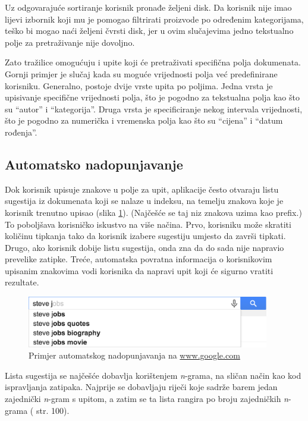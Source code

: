 \documentclass[a4paper,twoside,12pt]{scrreprt}
\begin{document}
Uz odgovarajuće sortiranje korisnik pronađe željeni disk. Da korisnik nije imao lijevi izbornik koji mu je pomogao filtrirati proizvode po određenim kategorijama, teško bi mogao naći željeni čvrsti disk, jer u ovim slučajevima jedno tekstualno polje za pretraživanje nije dovoljno.

Zato tražilice omogućuju i upite koji će pretraživati specifična polja dokumenata. Gornji primjer je slučaj kada su moguće vrijednosti polja već predefinirane korisniku. Generalno, postoje dvije vrste upita po poljima. Jedna vrsta je upisivanje specifične vrijednosti polja, što je pogodno za tekstualna polja kao što su ``autor'' i ``kategorija''. Druga vrsta je specificiranje nekog intervala vrijednosti, što je pogodno za numerička i vremenska polja kao što su ``cijena'' i ``datum rođenja''.


\subsection{Automatsko nadopunjavanje}

Dok korisnik upisuje znakove u polje za upit, aplikacije često otvaraju listu sugestija iz dokumenata koji se nalaze u indeksu, na temelju znakova koje je korisnik trenutno upisao (slika \ref{typeahead}). (Najčešće se taj niz znakova uzima kao prefix.) To poboljšava korisničko iskustvo na više načina. Prvo, korisniku može skratiti količinu tipkanja tako da korisnik izabere sugestiju umjesto da završi tipkati. Drugo, ako korisnik dobije listu sugestija, onda zna da do sada nije napravio prevelike zatipke. Treće, automatska povratna informacija o korisnikovim upisanim znakovima vodi korisnika da napravi upit koji će sigurno vratiti rezultate.

\begin{figure}[H]
  \centering
  \includegraphics[width=300pt]{typeahead}
  \caption{Primjer automatskog nadopunjavanja na \url{www.google.com}}
  \label{typeahead}
\end{figure}

Lista sugestija se najčešće dobavlja korištenjem \textit{n}-grama, na sličan način kao kod ispravljanja zatipaka. Najprije se dobavljaju riječi koje sadrže barem jedan zajednički \textit{n}-gram s upitom, a zatim se ta lista rangira po broju zajedničkih \textit{n}-grama (\cite{taming} str. 100).
\end{document}

